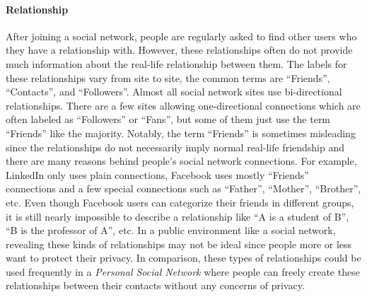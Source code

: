 \paragraph{Relationship}
After joining a social network, people are regularly asked to find other users who they have a relationship with. However, these relationships often do not provide much information about the real-life relationship between them. The labels for these relationships vary from site to site, the common terms are ``Friends'', ``Contacts'', and ``Followers''. Almost all social network sites use bi-directional relationships. There are a few sites allowing one-directional connections which are often labeled as ``Followers'' or ``Fans'', but some of them just use the term ``Friends'' like the majority. Notably, the term ``Friends'' is sometimes misleading since the relationships do not necessarily imply normal real-life friendship and there are many reasons behind people's social network connections. For example, LinkedIn only uses plain connections, Facebook uses mostly ``Friends'' connections and a few special connections such as ``Father'', ``Mother'', ``Brother'', etc. Even though Facebook users can categorize their friends in different groups, it is still nearly impossible to describe a relationship like ``A is a student of B'', ``B is the professor of A'', etc. In a public environment like a social network, revealing these kinds of relationships may not be ideal since people more or less want to protect their privacy. In comparison, these types of relationships could be used frequently in a \textit{Personal Social Network} where people can freely create these relationships between their contacts without any concerns of privacy.

